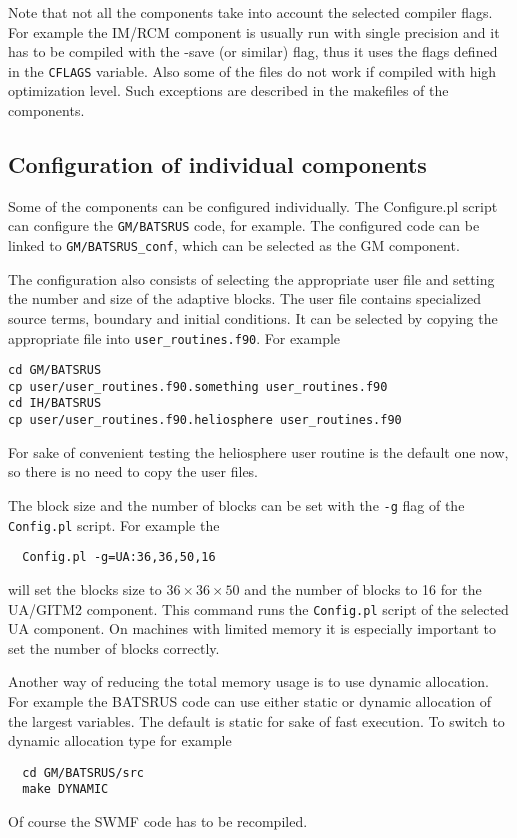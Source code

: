 Note that not all the components take into account the selected
compiler flags. For example the IM/RCM component is usually run
with single precision and it has to be compiled with the -save
(or similar) flag, thus it uses the flags defined in the {\tt CFLAGS} 
variable. Also some of the files
do not work if compiled with high optimization level.
Such exceptions are described in the makefiles of the 
components. 

\subsection{Configuration of individual components}

Some of the components can be configured individually. 
The Configure.pl script can configure the {\tt GM/BATSRUS} code, for example.
The configured code can be linked to {\tt GM/BATSRUS\_conf}, which can
be selected as the GM component.

The configuration also consists of selecting the 
appropriate user file and setting the number and size of the
adaptive blocks. The user file contains specialized
source terms, boundary and initial conditions. It can be 
selected by copying the appropriate file into {\tt user\_routines.f90}.
For example
\begin{verbatim}
cd GM/BATSRUS
cp user/user_routines.f90.something user_routines.f90
cd IH/BATSRUS
cp user/user_routines.f90.heliosphere user_routines.f90
\end{verbatim}
For sake of convenient testing the heliosphere user routine is
the default one now, so there is no need to copy the user files.

The block size and the number of blocks can be set with the 
{\tt -g} flag of the {\tt Config.pl} script.
For example the
\begin{verbatim}
  Config.pl -g=UA:36,36,50,16
\end{verbatim}
will set the blocks size to $36\times 36\times 50$ and the number of blocks to 
16 for the UA/GITM2 component. This command runs the {\tt Config.pl}
script of the selected UA component. 
On machines with limited memory it is especially important to
set the number of blocks correctly. 

Another way of reducing the total memory usage is to use dynamic
allocation. For example the BATSRUS code can use either static or
dynamic allocation of the largest variables. The default is static
for sake of fast execution. To switch to dynamic allocation type
for example
\begin{verbatim}
  cd GM/BATSRUS/src
  make DYNAMIC
\end{verbatim}
Of course the SWMF code has to be recompiled.

